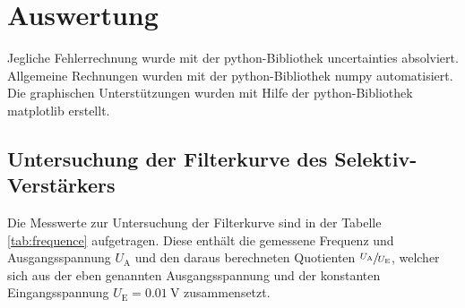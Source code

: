 \section{Auswertung}
\label{sec:Auswertung}
Jegliche Fehlerrechnung wurde mit der python-Bibliothek uncertainties \cite{uncertainties} absolviert.
Allgemeine Rechnungen wurden mit der python-Bibliothek numpy \cite{numpy} automatisiert. 
Die graphischen Unterstützungen wurden mit Hilfe der python-Bibliothek matplotlib \cite{matplotlib} erstellt.\\
\subsection{Untersuchung der Filterkurve des Selektiv-Verstärkers}
\label{sec:filter}
Die Messwerte zur Untersuchung der Filterkurve sind in der Tabelle \ref{tab:frequence} aufgetragen. 
Diese enthält die gemessene Frequenz und  Ausgangsspannung $U_\text{A}$ und den daraus berechneten Quotienten $\sfrac{U_\text{A}}{U_\text{E}}$, welcher sich aus der
eben genannten Ausgangsspannung und der konstanten Eingangsspannung $U_\text{E} = \SI{0.01}{\volt}$ zusammensetzt.

